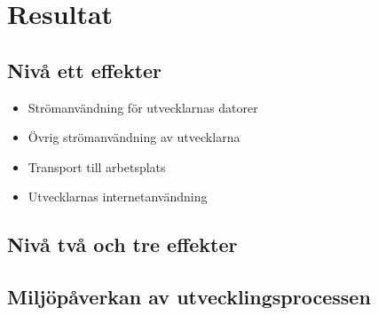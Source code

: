 \section{Resultat}
\label{sec:Lieth_Wahid-results}

\subsection{Nivå ett effekter}

\begin{itemize}
	\item Strömanvändning för utvecklarnas datorer
	\item Övrig strömanvändning av utvecklarna
	\item Transport till arbetsplats
	\item Utvecklarnas internetanvändning
\end{itemize}



\subsection{Nivå två och tre effekter}




\subsection{Miljöpåverkan av utvecklingsprocessen}
